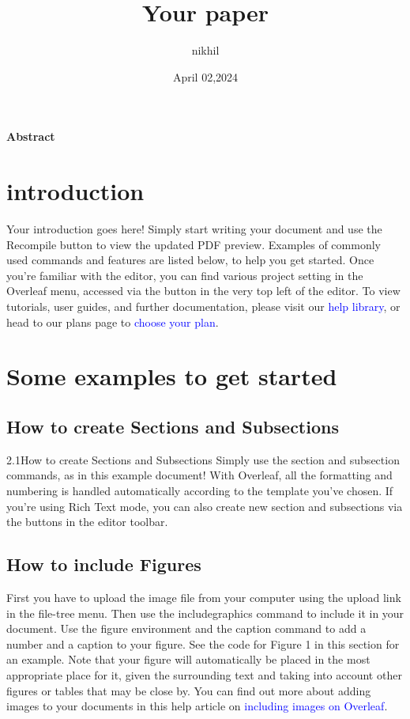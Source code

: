 \documentclass{article}
\title{Your paper}
\author{nikhil}
\date{April 02,2024}
\begin{document}
	\maketitle
	\center \textbf{Abstract}\\

	\section{introduction}
	Your introduction goes here! Simply start writing your document and use the Recompile button to
	view the updated PDF preview. Examples of commonly used commands and features are listed below,
	to help you get started.
	Once you’re familiar with the editor, you can find various project setting in the Overleaf menu,
	accessed via the button in the very top left of the editor. To view tutorials, user guides, and further
	documentation, please visit our \textcolor{blue}{help library}, or head to our plans page to \textcolor{blue}{choose your plan}.
	
	\section{\huge Some examples to get started}
	\subsection{How to create Sections and Subsections}
	2.1How to create Sections and Subsections
	Simply use the section and subsection commands, as in this example document! With Overleaf, all
	the formatting and numbering is handled automatically according to the template you’ve chosen. If
	you’re using Rich Text mode, you can also create new section and subsections via the buttons in the
	editor toolbar.
	
	\subsection{How to include Figures}
	
	First you have to upload the image file from your computer using the upload link in the file-tree menu.
	Then use the includegraphics command to include it in your document. Use the figure environment
	and the caption command to add a number and a caption to your figure. See the code for Figure 1 in
	this section for an example.
	Note that your figure will automatically be placed in the most appropriate place for it, given the
	surrounding text and taking into account other figures or tables that may be close by. You can find
	out more about adding images to your documents in this help article on \textcolor{blue}{including images on Overleaf}.
	
\end{document}
